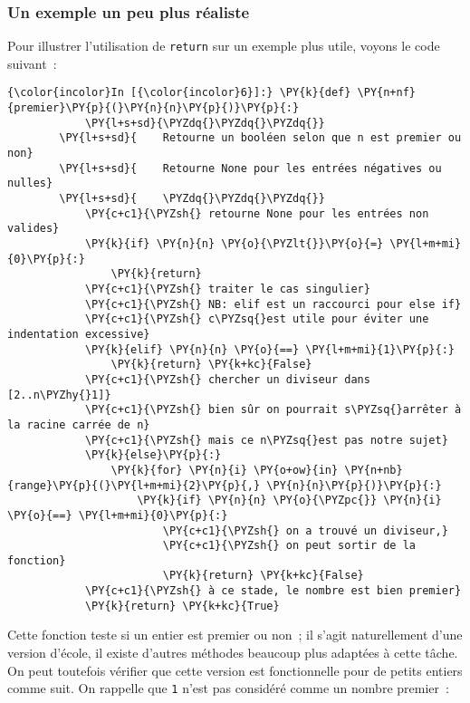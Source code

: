     \hypertarget{un-exemple-un-peu-plus-ruxe9aliste}{%
\subsubsection{Un exemple un peu plus
réaliste}\label{un-exemple-un-peu-plus-ruxe9aliste}}

    Pour illustrer l'utilisation de \texttt{return} sur un exemple plus
utile, voyons le code suivant~:

    \begin{Verbatim}[commandchars=\\\{\}]
{\color{incolor}In [{\color{incolor}6}]:} \PY{k}{def} \PY{n+nf}{premier}\PY{p}{(}\PY{n}{n}\PY{p}{)}\PY{p}{:}
            \PY{l+s+sd}{\PYZdq{}\PYZdq{}\PYZdq{}}
        \PY{l+s+sd}{    Retourne un booléen selon que n est premier ou non}
        \PY{l+s+sd}{    Retourne None pour les entrées négatives ou nulles}
        \PY{l+s+sd}{    \PYZdq{}\PYZdq{}\PYZdq{}}
            \PY{c+c1}{\PYZsh{} retourne None pour les entrées non valides}
            \PY{k}{if} \PY{n}{n} \PY{o}{\PYZlt{}}\PY{o}{=} \PY{l+m+mi}{0}\PY{p}{:}
                \PY{k}{return}
            \PY{c+c1}{\PYZsh{} traiter le cas singulier}
            \PY{c+c1}{\PYZsh{} NB: elif est un raccourci pour else if}
            \PY{c+c1}{\PYZsh{} c\PYZsq{}est utile pour éviter une indentation excessive}
            \PY{k}{elif} \PY{n}{n} \PY{o}{==} \PY{l+m+mi}{1}\PY{p}{:}
                \PY{k}{return} \PY{k+kc}{False}
            \PY{c+c1}{\PYZsh{} chercher un diviseur dans [2..n\PYZhy{}1]}
            \PY{c+c1}{\PYZsh{} bien sûr on pourrait s\PYZsq{}arrêter à la racine carrée de n}
            \PY{c+c1}{\PYZsh{} mais ce n\PYZsq{}est pas notre sujet}
            \PY{k}{else}\PY{p}{:}
                \PY{k}{for} \PY{n}{i} \PY{o+ow}{in} \PY{n+nb}{range}\PY{p}{(}\PY{l+m+mi}{2}\PY{p}{,} \PY{n}{n}\PY{p}{)}\PY{p}{:}
                    \PY{k}{if} \PY{n}{n} \PY{o}{\PYZpc{}} \PY{n}{i} \PY{o}{==} \PY{l+m+mi}{0}\PY{p}{:}
                        \PY{c+c1}{\PYZsh{} on a trouvé un diviseur,}
                        \PY{c+c1}{\PYZsh{} on peut sortir de la fonction}
                        \PY{k}{return} \PY{k+kc}{False}
            \PY{c+c1}{\PYZsh{} à ce stade, le nombre est bien premier}
            \PY{k}{return} \PY{k+kc}{True}
\end{Verbatim}


    Cette fonction teste si un entier est premier ou non~; il s'agit
naturellement d'une version d'école, il existe d'autres méthodes
beaucoup plus adaptées à cette tâche. On peut toutefois vérifier que
cette version est fonctionnelle pour de petits entiers comme suit. On
rappelle que \texttt{1} n'est pas considéré comme un nombre premier~:

